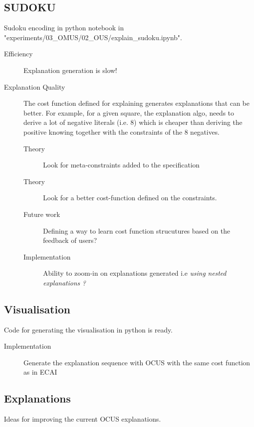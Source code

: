 \documentclass{article}
\newcommand\comment[1]{\marginpar{\tiny #1}}
\renewcommand\comment[1]{#1}
\newcommand{\todo}[1]{{\comment{\color{blue}#1}}}
\begin{document}
\subsection{SUDOKU}\label{sudoku}
Sudoku encoding in python notebook in "experiments/03\_OMUS/02\_OUS/explain\_sudoku.ipynb". 
\begin{description}
  \item[Efficiency] Explanation generation is slow!
  \item[Explanation Quality] The cost function defined for explaining generates explanations that can be better. For example, for a given square, the explanation algo, needs to derive a lot of negative literals (i.e. 8) which is cheaper than deriving the positive knowing together with the constraints of the 8 negatives.
  \begin{description}
    \item[Theory] \todo{Look for meta-constraints added to the specification}
    \item[Theory] \todo{Look for a better cost-function defined on the constraints.}
    \item[Future work] \todo{Defining a way to learn cost function strucutures based on the feedback of users?}
    \item[Implementation] \todo{Ability to zoom-in on explanations generated i.e \textit{using nested explanations ?}}
  \end{description}
\end{description}

\subsection{Visualisation}
Code for generating the visualisation in python is ready. 
\begin{description}
  \item[Implementation] \todo{Generate the explanation sequence with OCUS with the same cost function as in ECAI}
\end{description}

\subsection{Explanations}
Ideas for improving the current OCUS explanations.
\end{document}
